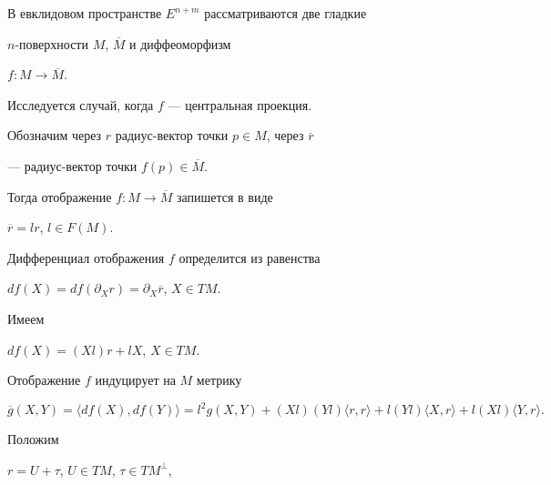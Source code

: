 \date{} 




 


\pagestyle{plain} %


 


 




 


\maketitle 


\label{begin} 


В евклидовом пространстве $E^{n+m}$ рассматриваются две гладкие 


$n$-поверхности $M$, $\overline {M}$ и диффеоморфизм


$f:M \rightarrow  \overline{M}$.


Исследуется случай, когда $f$ --- центральная проекция.                                 





Обозначим через $r$ радиус-вектор точки $p \in M$, через $\overline{r}$


--- радиус-вектор точки $f(p) \in {\overline M}$. 


Тогда отображение $f: M \rightarrow \overline{M}$  запишется в виде


$\overline{r}=lr$, $l\in F(M).$


Дифференциал отображения $f$   определится из равенства


$df(X)= df(\partial _{X} r) = \partial _{X} \overline{r}$, $X \in TM. $


Имеем


$ df(X)=(Xl)r+lX$, $X \in TM. $


Отображение $f$  индуцирует на $M$  метрику


$$


\overline{g}(X,Y)=\langle df(X),df(Y)\rangle =


l^2 g(X,Y)+ (Xl)(Yl)\langle


r,r\rangle  + l(Yl)\langle X,r\rangle+ l(Xl)\langle Y,r\rangle.


$$


Положим


$r = U+\tau$, $U \in TM$, $\tau \in TM^{\bot}$,


